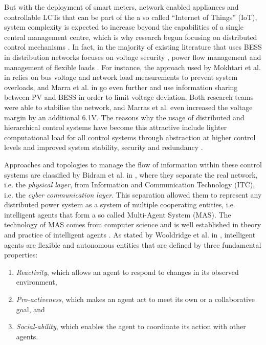 But with the deployment of smart meters, network enabled appliances and controllable LCTs that can be part of the a so called ``Internet of Things'' (IoT), system complexity is expected to increase beyond the capabilities of a single central management centre, which is why research begun focusing on distributed control mechanisms \cite{Vovos2007, Guerrero2008, Bidram2014, Sugihara2013, Toledo2013, Marra2013, Mokhtari2013, Gill2014, Dolan2012, Atia2016, Bidram2012, Wang2016}.
In fact, in the majority of existing literature that uses BESS in distribution networks focuses on voltage security \cite{Sugihara2013, Toledo2013, Marra2013, Mokhtari2013, Atia2016}, power flow management \cite{Guerrero2008, Wang2016} and management of flexible loads \cite{Gill2014, Dolan2012}.
For instance, the approach used by Mokhtari et al. in \cite{Mokhtari2013} relies on bus voltage and network load measurements to prevent system overloads, and Marra et al. in \cite{Marra2013} go even further and use information sharing between PV and BESS in order to limit voltage deviation.
Both research teams were able to stabilise the network, and Marras et al. even increased the voltage margin by an additional 6.1V.
The reasons why the usage of distributed and hierarchical control systems have become this attractive include lighter computational load for all control systems through abstraction at higher control levels and improved system stability, security and redundancy \cite{Guerrero2013}.

Approaches and topologies to manage the flow of information within these control systems are classified by Bidram et al. in \cite{Bidram2014}, where they separate the real network, i.e. the \textit{physical layer}, from Information and Communication Technology (ITC), i.e. the \textit{cyber communication layer}.
This separation allowed them to represent any distributed power system as a system of multiple cooperating entities, i.e. intelligent agents that form a so called Multi-Agent System (MAS).
The technology of MAS comes from computer science and is well established in theory and practice of intelligent agents \cite{Russell2009}.
As stated by Wooldridge et al. in \cite{Wooldridge1995}, intelligent agents are flexible and autonomous entities that are defined by three fundamental properties:

\begin{enumerate}
	\item \textit{Reactivity}, which allows an agent to respond to changes in its observed environment,
	\item \textit{Pro-activeness}, which makes an agent act to meet its own or a collaborative goal, and
	\item \textit{Social-ability}, which enables the agent to coordinate its action with other agents.
\end{enumerate}

